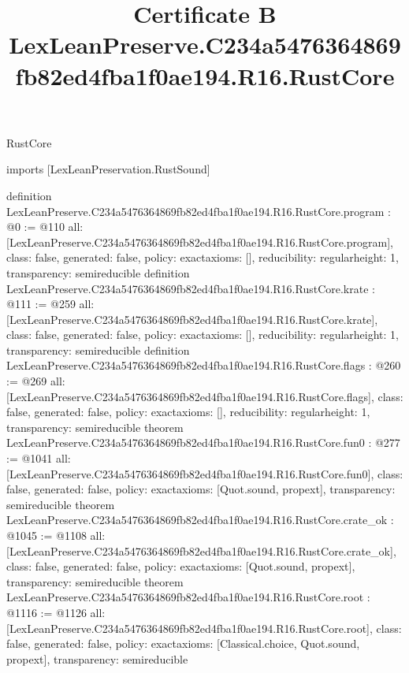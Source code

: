 \begin{lexlean}{RustCore}
\title{Certificate B LexLeanPreserve.C234a5476364869fb82ed4fba1f0ae194.R16.RustCore}
\begin{coremodule}
imports [LexLeanPreservation.RustSound]

definition LexLeanPreserve.C234a5476364869fb82ed4fba1f0ae194.R16.RustCore.program : @0 := @110 {
  all: [LexLeanPreserve.C234a5476364869fb82ed4fba1f0ae194.R16.RustCore.program],
  class: false,
  generated: false,
  policy: exact{axioms: []},
  reducibility: regular{height: 1},
  transparency: semireducible
}
definition LexLeanPreserve.C234a5476364869fb82ed4fba1f0ae194.R16.RustCore.krate : @111 := @259 {
  all: [LexLeanPreserve.C234a5476364869fb82ed4fba1f0ae194.R16.RustCore.krate],
  class: false,
  generated: false,
  policy: exact{axioms: []},
  reducibility: regular{height: 1},
  transparency: semireducible
}
definition LexLeanPreserve.C234a5476364869fb82ed4fba1f0ae194.R16.RustCore.flags : @260 := @269 {
  all: [LexLeanPreserve.C234a5476364869fb82ed4fba1f0ae194.R16.RustCore.flags],
  class: false,
  generated: false,
  policy: exact{axioms: []},
  reducibility: regular{height: 1},
  transparency: semireducible
}
theorem LexLeanPreserve.C234a5476364869fb82ed4fba1f0ae194.R16.RustCore.fun0 : @277 := @1041 {
  all: [LexLeanPreserve.C234a5476364869fb82ed4fba1f0ae194.R16.RustCore.fun0],
  class: false,
  generated: false,
  policy: exact{axioms: [Quot.sound, propext]},
  transparency: semireducible
}
theorem LexLeanPreserve.C234a5476364869fb82ed4fba1f0ae194.R16.RustCore.crate_ok : @1045 := @1108 {
  all: [LexLeanPreserve.C234a5476364869fb82ed4fba1f0ae194.R16.RustCore.crate_ok],
  class: false,
  generated: false,
  policy: exact{axioms: [Quot.sound, propext]},
  transparency: semireducible
}
theorem LexLeanPreserve.C234a5476364869fb82ed4fba1f0ae194.R16.RustCore.root : @1116 := @1126 {
  all: [LexLeanPreserve.C234a5476364869fb82ed4fba1f0ae194.R16.RustCore.root],
  class: false,
  generated: false,
  policy: exact{axioms: [Classical.choice, Quot.sound, propext]},
  transparency: semireducible
}


\end{coremodule}
\end{lexlean}
